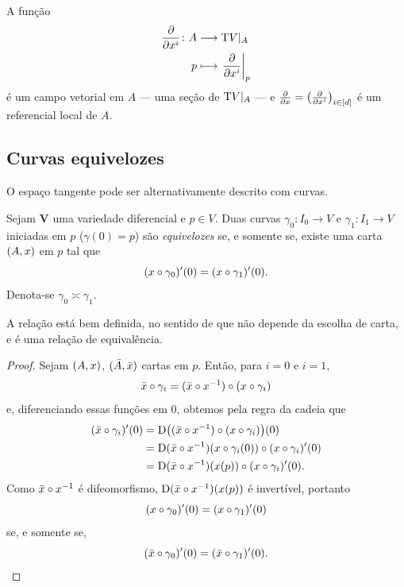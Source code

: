 A função
	\begin{align*}
	{\frac{\partial{}}{\partial{x^i}}}\colon {A} &\longrightarrow {\mathrm{T}V|_A} \\{p} &\longmapsto \left.{\frac{\partial{}}{\partial{x^i}}}\right|_p
	\end{align*}
é um campo vetorial em $A$ --- uma seção de $\mathrm{T} V|_A$ --- e $\frac{\partial{}}{\partial{x}} = \left( \frac{\partial{}}{\partial{x^i}} \right)_{i \in [d]}$ é um referencial local de $A$.


\subsection{Curvas equivelozes}

O espaço tangente pode ser alternativamente descrito com curvas.

\begin{definition}
Sejam $\bm V$ uma variedade diferencial e $p \in V$. Duas curvas $\gamma_0\colon I_0 \to V$ e $\gamma_1\colon I_1 \to V$ iniciadas em $p$ ($\gamma(0)=p$) são \emph{equivelozes} se, e somente se, existe uma carta $(A,x)$ em $p$ tal que
	\begin{equation*}
	(x \circ \gamma_0)'(0) = (x \circ \gamma_1)'(0).
	\end{equation*}
Denota-se $\gamma_0 \asymp \gamma_1$.
\end{definition}

A relação está bem definida, no sentido de que não depende da escolha de carta, e é uma relação de equivalência.

\begin{proof}
Sejam $(A,x)$, $(\bar A,\bar {x})$ cartas em $p$. Então, para $i=0$ e $i=1$,
	\begin{equation*}
	\bar{x} \circ \gamma_i = (\bar{x} \circ x^{-1}) \circ (x \circ \gamma_i)
	\end{equation*}
e, diferenciando essas funções em $0$, obtemos pela regra da cadeia que
	\begin{align*}
	(\bar{x} \circ \gamma_i)'(0) &= \mathrm{D} \big( (\bar{x} \circ x^{-1}) \circ (x \circ \gamma_i) \big)(0) \\
	&= \mathrm{D}(\bar{x} \circ x^{-1})(x \circ \gamma_i(0)) \circ (x \circ \gamma_i)'(0) \\
	&=  \mathrm{D}(\bar{x} \circ x^{-1})(x(p)) \circ (x \circ \gamma_i)'(0).
	\end{align*}
Como $\bar{x} \circ x^{-1}$ é difeomorfismo, $\mathrm{D}(\bar{x} \circ x^{-1})(x(p))$ é invertível, portanto
	\begin{equation*}
	(x \circ \gamma_0)'(0) = (x \circ \gamma_1)'(0)
	\end{equation*}
se, e somente se,
	\begin{equation*}
	(\bar{x} \circ \gamma_0)'(0) = (\bar{x} \circ \gamma_1)'(0).
	\end{equation*}
\end{proof}

